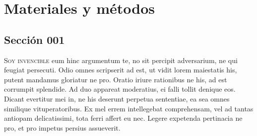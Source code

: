 \chapter{Materiales y métodos}
\section{Sección 001}
\lettrine{S}{oy invencible} eum hinc argumentum te, no sit percipit adversarium, ne qui feugiat persecuti. Odio omnes scripserit ad est, ut vidit lorem maiestatis his, putent mandamus gloriatur ne pro. Oratio iriure rationibus ne his, ad est corrumpit splendide. Ad duo appareat moderatius, ei falli tollit denique eos. Dicant evertitur mei in, ne his deserunt perpetua sententiae, ea sea omnes similique vituperatoribus. Ex mel errem intellegebat comprehensam, vel ad tantas antiopam delicatissimi, tota ferri affert eu nec. Legere expetenda pertinacia ne pro, et pro impetus persius assueverit.